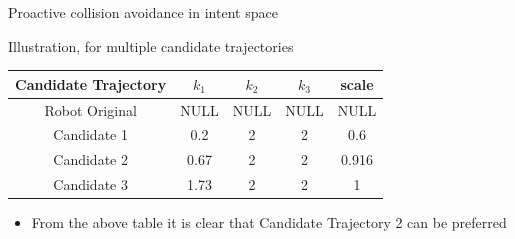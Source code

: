 \documentclass{beamer}
\begin{document}
\begin{frame}{Proactive collision avoidance in intent space}
\begin{block}{Illustration, for multiple candidate trajectories}

\begin{center}
\begin{tabular} { |c|c|c|c|c| }
 \hline
 Candidate Trajectory & $k_1$ & $k_2$ & $k_3$ & scale \\
\hline
 Robot Original  & NULL  & NULL & NULL & NULL  \\
\hline
Candidate 1 & 0.2 & 2 & 2 & 0.6 \\
\hline
Candidate 2 & 0.67 & 2 & 2 & 0.916 \\
\hline
Candidate 3 & 1.73 & 2 & 2 & 1\\
\hline
\end{tabular}
\end{center}
\begin{itemize}
\item{From the above table it is clear that Candidate Trajectory 2 can be preferred }
\end{itemize}
\end{block}
\end{frame}
\end{document}

